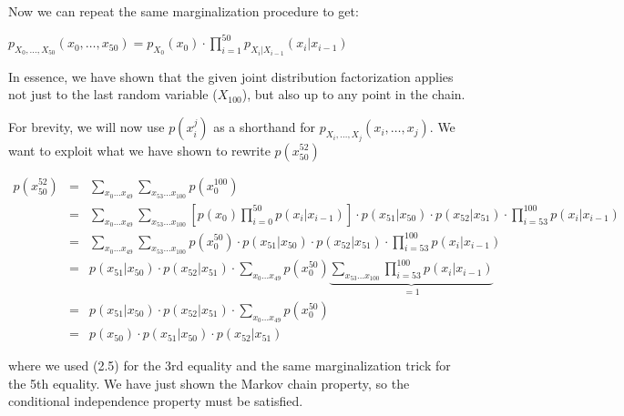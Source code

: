 \documentclass[6008notes.tex]{subfiles}
\begin{document}
Now we can repeat the same marginalization procedure to get:

{\centering$p_{X_0, \dots , X_{50}}(x_0, \dots , x_{50}) = p_{X_0}(x_0) \cdot \prod _{i=1}^{50} p_{X_ i | X_{i-1}}(x_ i | x_{i-1})$ \par}

In essence, we have shown that the given joint distribution factorization applies not just to the last random variable ($X_{100}$), but also up to any point in the chain.

For brevity, we will now use $p(x_{i}^{j})$ as a shorthand for $p_{X_ i, \dots , X_{j}}(x_ i, \dots , x_{j})$. We want to exploit what we have shown to rewrite $p(x_{50}^{52})$

\begin{eqnarray*}
		p(x_{50}^{52})
        &=& \sum_{x_{0} \dots x_{49}} \sum_{x_{53} \dots x_{100}} p(x_{0}^{100}) \\
		&=& \sum_{x_{0} \dots x_{49}} \sum_{x_{53} \dots x_{100}} \left[p(x_{0}) \prod_{i=0}^{50} p(x_{i}|x_{i-1})\right] \cdot p(x_{51}|x_{50}) \cdot p(x_{52}|x_{51}) \cdot \prod_{i=53}^{100} p(x_{i}|x_{i-1}) \\
		&=& \sum_{x_{0} \dots x_{49}} \sum_{x_{53} \dots x_{100}} p(x_{0}^{50}) \cdot p(x_{51}|x_{50}) \cdot p(x_{52}|x_{51}) \cdot \prod_{i=53}^{100} p(x_{i}|x_{i-1}) \\
		&=& p(x_{51}|x_{50}) \cdot p(x_{52}|x_{51}) \cdot \sum_{x_{0} \dots x_{49}} p(x_{0}^{50}) \underbrace{\sum_{x_{53} \dots x_{100}} \prod_{i=53}^{100} p(x_{i}|x_{i-1})}_{=1} \\
		&=& p(x_{51}|x_{50}) \cdot p(x_{52}|x_{51}) \cdot \sum_{x_{0} \dots x_{49}} p(x_{0}^{50}) \\
		&=& p(x_{50}) \cdot p(x_{51}|x_{50}) \cdot p(x_{52}|x_{51})
    \end{eqnarray*}
		
where we used (2.5) for the 3rd equality and the same marginalization trick for the 5th equality. We have just shown the Markov chain property, so the conditional independence property must be satisfied.
\end{document}
